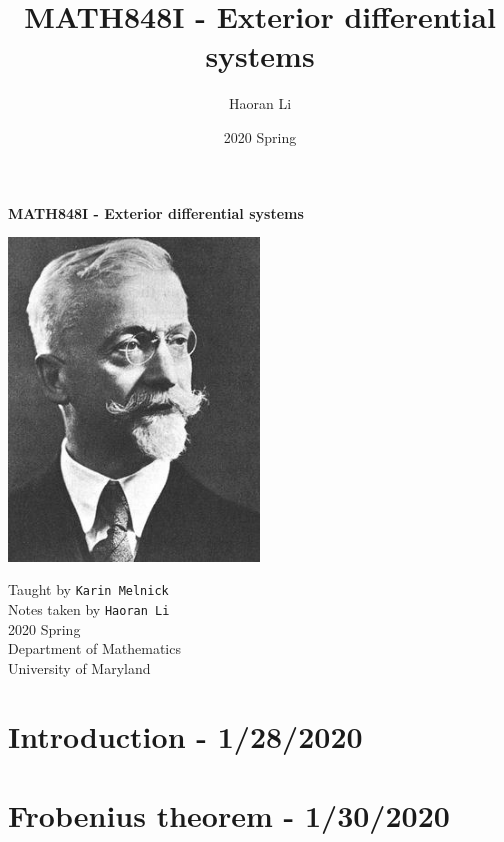 \documentclass[a4paper,10pt]{article}
\title{MATH848I - Exterior differential systems}
\author{Haoran Li}
\date{2020 Spring}
\begin{document}
\sloppy %

\begin{titlepage}
\begin{center}
\vspace*{1cm}
\LARGE
\textbf{MATH848I - Exterior differential systems} \\
\vspace{2cm}
\begin{center}
\includegraphics[width=0.5\textwidth]{Pictures/Elie_Cartan.jpg}
\end{center}
\vspace{2cm}
\normalsize
Taught by \texttt{Karin Melnick} \\
Notes taken by \texttt{Haoran Li} \\
2020 Spring \\
\vspace{2cm}
Department of Mathematics\\
University of Maryland\\
\end{center}
\end{titlepage}

\tableofcontents
\newpage

\section{Introduction - 1/28/2020}

\newpage

\section{Frobenius theorem - 1/30/2020}

\newpage
\end{document}
